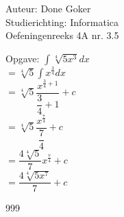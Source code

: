\documentclass[a4paper]{article}
\begin{document}
  
\noindent \large Auteur: Done Goker \\
\noindent \large Studierichting: Informatica\\
\noindent \large Oefeningenreeks 4A nr. 3.5\\

\medskip

\normalsize

Opgave:
$\displaystyle\int \sqrt[4]{5x^3} dx$ \\

$ = \sqrt[4]{5} \displaystyle\int x^{\tfrac{3}{4}} dx$ \\

$ = \sqrt[4]{5} \dfrac{x^{\tfrac{3}{4} + 1}}{\dfrac{3}{4} + 1} + c$ \\

$ = \sqrt[4]{5} \dfrac{x^{\tfrac{7}{4} }}{\dfrac{7}{4}} + c$ \\

$ = \dfrac{4\sqrt[4]{5}}{7} x^ {\tfrac{7}{4}}  + c$ \\

$ = \dfrac{4\sqrt[4]{5x^7}}{7} + c$ \\




\begin{thebibliography}{999}
\end{thebibliography}
\end{document}
